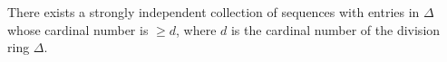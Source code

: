 There exists a strongly independent collection of sequences with entries in $\Delta$ whose cardinal number is $\geq d$, where $d$ is the cardinal number of the division ring $\Delta$.
